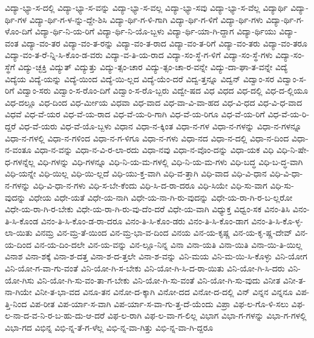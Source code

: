 {ವಿದ್ಯಾ-ಭ್ಯಾ-ಸ-ದಲ್ಲಿ
ವಿದ್ಯಾ-ಭ್ಯಾ-ಸ-ವನ್ನು
ವಿದ್ಯಾ-ಭ್ಯಾ-ಸ-ವಲ್ಲ
ವಿದ್ಯಾ-ಭ್ಯಾ-ಸವು
ವಿದ್ಯಾ-ಭ್ಯಾ-ಸ-ವೆಲ್ಲ
ವಿದ್ಯಾರ್ಥಿ
ವಿದ್ಯಾ-ರ್ಥಿ-ಗಳ
ವಿದ್ಯಾ-ರ್ಥಿ-ಗ-ಳ-ನ್ನು-ದ್ದೇ-ಶಿಸಿ
ವಿದ್ಯಾ-ರ್ಥಿ-ಗ-ಳಿ-ಗಾಗಿ
ವಿದ್ಯಾ-ರ್ಥಿ-ಗ-ಳಿಗೆ
ವಿದ್ಯಾ-ರ್ಥಿ-ಗಳು
ವಿದ್ಯಾ-ರ್ಥಿ-ಗ-ಳೊಂ-ದಿಗೆ
ವಿದ್ಯಾ-ರ್ಥಿ-ನಿ-ಯ-ರಿಗೆ
ವಿದ್ಯಾ-ರ್ಥಿ-ನಿ-ಯೊ-ಬ್ಬಳು
ವಿದ್ಯಾ-ರ್ಥಿ-ಯಾ-ಗಿ-ದ್ದಾಗ
ವಿದ್ಯಾ-ರ್ಥಿಯು
ವಿದ್ಯಾ-ವಂತ
ವಿದ್ಯಾ-ವಂ-ತರ
ವಿದ್ಯಾ-ವಂ-ತ-ರನ್ನು
ವಿದ್ಯಾ-ವಂ-ತ-ರಾದ
ವಿದ್ಯಾ-ವಂ-ತ-ರಿಗೆ
ವಿದ್ಯಾ-ವಂ-ತರು
ವಿದ್ಯಾ-ವಂ-ತರೂ
ವಿದ್ಯಾ-ವಂ-ತ-ರೆ-ನ್ನಿ-ಸಿ-ಕೊಂ-ಡ-ವರು
ವಿದ್ಯಾ-ವ-ತಿ-ಯ-ರಾದ
ವಿದ್ಯಾ-ಸಂ-ಸ್ಥೆ-ಗ-ಳಿಗೆ
ವಿದ್ಯಾ-ಸಂ-ಸ್ಥೆ-ಗಳು
ವಿದ್ಯಾ-ಸಂ-ಸ್ಥೆಗೆ
ವಿದ್ಯು-ಚ್ಛಕ್ತಿ
ವಿದ್ಯುತ್
ವಿದ್ಯುತ್ತು
ವಿದ್ಯು-ತ್ಸಂ-ಚಾರ
ವಿದ್ಯು-ತ್ಸಂ-ಚಾ-ರ-ವನ್ನೇ
ವಿದ್ಯು-ದಾ-ಘಾ-ತ-ವನ್ನೇ
ವಿದ್ಯೆ
ವಿದ್ಯೆಯ
ವಿದ್ಯೆ-ಯನ್ನು
ವಿದ್ಯೆ-ಯಿಂದ
ವಿದ್ಯೆ-ಯಿ-ಲ್ಲದ
ವಿದ್ಯೆ-ಯೆಂ-ದರೆ
ವಿದ್ವ-ತ್ತನ್ನೂ
ವಿದ್ವನ್
ವಿದ್ವಾಂ-ಸರ
ವಿದ್ವಾಂ-ಸ-ರಿಗೆ
ವಿದ್ವಾಂ-ಸರು
ವಿದ್ವಾಂ-ಸ-ರೊಂ-ದಿಗೆ
ವಿದ್ವಾಂ-ಸ-ರೊ-ಬ್ಬರು
ವಿದ್ವೇ-ಷದ
ವಿಧ
ವಿಧದ
ವಿಧ-ದಲ್ಲಿ
ವಿಧ-ದ-ಲ್ಲಿಯೂ
ವಿಧ-ದಲ್ಲೂ
ವಿಧ-ದಿಂದ
ವಿಧ-ರ್ಮೀಯ
ವಿಧವಾ
ವಿಧ-ವಾದ
ವಿಧ-ವಾ-ವಿ-ವಾ-ಹದ
ವಿಧ-ವಿ-ಧದ
ವಿಧ-ವಿ-ಧ-ವಾದ
ವಿಧವೆ
ವಿಧ-ವೆ-ಯರ
ವಿಧ-ವೆ-ಯ-ರಾದ
ವಿಧ-ವೆ-ಯ-ರಿ-ಗಾಗಿ
ವಿಧ-ವೆ-ಯ-ರಿಗೂ
ವಿಧ-ವೆ-ಯ-ರಿಗೆ
ವಿಧ-ವೆ-ಯ-ರಿ-ದ್ದರೆ
ವಿಧ-ವೆ-ಯರು
ವಿಧ-ವೆ-ಯೊ-ಬ್ಬಳು
ವಿಧಾನ
ವಿಧಾ-ನ-ಕ್ಕಿಂತ
ವಿಧಾ-ನ-ಗಳ
ವಿಧಾ-ನ-ಗಳನ್ನು
ವಿಧಾ-ನ-ಗಳನ್ನೂ
ವಿಧಾ-ನ-ಗಳಲ್ಲಿ
ವಿಧಾ-ನ-ಗಳಿಂದ
ವಿಧಾ-ನ-ಗ-ಳಿಗೂ
ವಿಧಾ-ನ-ಗಳು
ವಿಧಾ-ನದ
ವಿಧಾ-ನ-ದಲ್ಲಿ
ವಿಧಾ-ನ-ದಿಂದ
ವಿಧಾ-ನ-ವಂತೂ
ವಿಧಾ-ನ-ವನ್ನು
ವಿಧಾ-ನ-ವಿ-ರ-ಲಾ-ರದು
ವಿಧಾ-ನವು
ವಿಧಾ-ನ-ವೊಂ-ದನ್ನು
ವಿಧಾ-ಯಕ
ವಿಧಿ
ವಿಧಿ-ನಿ-ಷೇ-ಧ-ಗಳನ್ನೆಲ್ಲ
ವಿಧಿ-ಗಳನ್ನು
ವಿಧಿ-ಗಳನ್ನೂ
ವಿಧಿ-ನಿ-ಯ-ಮ-ಗಳಲ್ಲಿ
ವಿಧಿ-ನಿ-ಯ-ಮ-ಗಳು
ವಿಧಿ-ಬದ್ಧ
ವಿಧಿ-ಬ-ದ್ಧ-ವಾಗಿ
ವಿಧಿ-ಯನ್ನೇ
ವಿಧಿ-ಯಿಲ್ಲ
ವಿಧಿ-ಯಿ-ಲ್ಲದೆ
ವಿಧಿ-ಯು-ಕ್ತ-ವಾಗಿ
ವಿಧಿ-ವ-ತ್ತಾಗಿ
ವಿಧಿ-ವಾದ
ವಿಧಿ-ವಿ-ಧಾನ
ವಿಧಿ-ವಿ-ಧಾ-ನ-ಗಳನ್ನು
ವಿಧಿ-ವಿ-ಧಾ-ನ-ಗಳು
ವಿಧಿ-ಸ-ಬೇ-ಕೆಂದು
ವಿಧಿ-ಸಿ-ದ-ರಾ-ದರೂ
ವಿಧಿ-ಸಿಯೇ
ವಿಧಿ-ಸು-ವಾಗ
ವಿಧಿ-ಸು-ವುದನ್ನು
ವಿಧೇಯ
ವಿಧೇ-ಯತೆ
ವಿಧೇ-ಯ-ನಾಗಿ
ವಿಧೇ-ಯ-ನಾ-ಗಿ-ರು-ವುದನ್ನು
ವಿಧೇ-ಯ-ರಾ-ಗಿ-ರ-ಬ-ಲ್ಲರೋ
ವಿಧೇ-ಯ-ರಾ-ಗಿ-ರ-ಬೇಕು
ವಿಧೇ-ಯ-ರಾ-ಗಿ-ರು-ವು-ದೆಂ-ದರೆ
ವಿಧೇ-ಯ-ವಾಗಿ
ವಿಧ್ಯುಕ್ತ
ವಿಧ್ವಂ-ಸಕ
ವಿನಂ-ತಿಸಿ
ವಿನಂ-ತಿ-ಸಿ-ಕೊಂಡ
ವಿನಂ-ತಿ-ಸಿ-ಕೊಂ-ಡ-ರಾ-ದರೂ
ವಿನಂ-ತಿ-ಸಿ-ಕೊಂ-ಡರು
ವಿನಂ-ತಿ-ಸಿ-ಕೊಂ-ಡಾಗ
ವಿನಂ-ತಿ-ಸಿ-ಕೊ-ಳ್ಳ-ಲಾ-ಯಿತು
ವಿನಮ್ರ
ವಿನ-ಮ್ರ-ತೆ-ಯಿಂದ
ವಿನ-ಮ್ರ-ಭಾ-ವ-ದಿಂದ
ವಿನಯ
ವಿನ-ಯ-ಕೃಷ್ಣ
ವಿನ-ಯ-ಕೃ-ಷ್ಣ-ದೇವ್
ವಿನ-ಯ-ದಿಂದ
ವಿನ-ಯ-ದಿಂ-ದಲೇ
ವಿನ-ಯ-ವನ್ನು
ವಿನ-ಲ್ಲೂ-ನಿನ್ನ
ವಿನಾ
ವಿನಾ-ಯತಿ
ವಿನಾ-ಯಿತಿ
ವಿನಾ-ಯಿ-ತಿ-ಯಿಲ್ಲ
ವಿನಾಶ
ವಿನಾ-ಶಕ್ಕೆ
ವಿನಾ-ಶ-ದತ್ತ
ವಿನಾ-ಶ-ದ-ತ್ತಲೇ
ವಿನಾ-ಶ-ವನ್ನು
ವಿನಿ-ಮಯ
ವಿನಿ-ಮ-ಯಿ-ಸಿ-ಕೊಳ್ಳು
ವಿನಿ-ಯೋಗ
ವಿನಿ-ಯೋ-ಗ-ವಾ-ಗು-ವಂತೆ
ವಿನಿ-ಯೋ-ಗಿ-ಸ-ಬೇಕು
ವಿನಿ-ಯೋ-ಗಿ-ಸಿ-ದ-ರಾ-ಯಿತು
ವಿನಿ-ಯೋ-ಗಿ-ಸಿ-ದರು
ವಿನಿ-ಯೋ-ಗಿಸು
ವಿನಿ-ಯೋ-ಗಿ-ಸು-ವಂ-ತಾ-ಗ-ಬೇಕು
ವಿನಿ-ಯೋ-ಗಿ-ಸು-ವಂತೆ
ವಿನಿ-ಯೋ-ಗಿ-ಸು-ವುದು
ವಿನೀತ
ವಿನೀ-ತ-ನಾ-ಗಿಯೇ
ವಿನೀ-ತ-ಭಾ-ವದ
ವಿನೂ-ತನ
ವಿನೋ-ದ-ಕ್ಕಾಗಿ
ವಿನೋ-ದದ
ವಿನೋ-ದ-ದಲ್ಲಿ
ವಿನ್
ವಿನ್ನನ
ವಿನ್ನನೂ
ವಿಪ-ತ್ತಿ-ನಿಂದ
ವಿಪ-ರೀತ
ವಿಪ-ರ್ಯಾ-ಸ-ವಾಗಿ
ವಿಪ-ರ್ಯಾ-ಸ-ವಾ-ಗು-ತ್ತ-ದೆ-ಯೆಂದು
ವಿಪ್ರಾ
ವಿಫ-ಲ-ಗೊ-ಳಿ-ಸಲು
ವಿಫ-ಲ-ನಾ-ದ-ವ-ನಿ-ರ-ಬ-ಹು-ದು-ಆ-ದರೆ
ವಿಫ-ಲ-ರಾಗಿ
ವಿಫ-ಲ-ವಾ-ಗ-ಲಿಲ್ಲ
ವಿಭಾಗ
ವಿಭಾ-ಗ-ಗಳನ್ನು
ವಿಭಾ-ಗ-ಗಳಲ್ಲಿ
ವಿಭಾ-ಗದ
ವಿಭಿನ್ನ
ವಿಭಿ-ನ್ನ-ತೆ-ಗ-ಳೆಲ್ಲ
ವಿಭಿ-ನ್ನ-ವಾ-ಗಿತ್ತು
ವಿಭಿ-ನ್ನ-ವಾ-ಗಿ-ದ್ದರೂ
}
